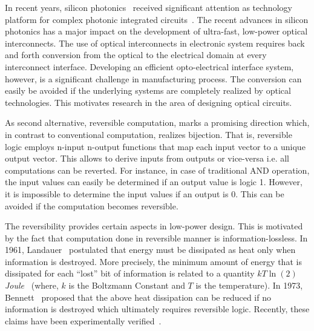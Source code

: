 \documentclass[10pt,letterpaper,twoside,openright]{book}
\begin{document}
In recent years, silicon photonics~\cite{Pavesi:2004} received significant attention as technology platform for complex photonic integrated circuits~\cite{NJSBB2005}. The recent advances in silicon photonics has a major impact on the development of ultra-fast, low-power optical interconnects. 
The use of optical interconnects in electronic system requires back and forth conversion from the optical to the electrical domain at every interconnect interface. Developing an efficient opto-electrical interface system, however, is a significant challenge in manufacturing process. The conversion can easily be avoided if the underlying systems are completely realized by optical technologies. This motivates research in the area of designing optical circuits.   

As second alternative, reversible computation, marks a promising direction which, in contrast to conventional computation, realizes bijection. That is, reversible logic employs n-input n-output functions that map each input vector to a unique output vector. This allows to derive inputs from outputs or vice-versa i.e. all computations can be reverted. For instance, in case of traditional AND operation, the input values can easily be determined if an output value is logic 1. However, it is impossible to determine the input values if an output is 0. This can be avoided if the computation becomes reversible.

The reversibility provides certain aspects in low-power design. This is motivated by the fact that computation done in reversible manner is information-lossless. In 1961, Landauer~\cite{Lan:61} postulated that energy must be dissipated as heat only when information is destroyed. More precisely, the minimum amount of energy that is dissipated for each \enquote{lost} bit of information is related to a quantity $kT\ln(2)$ \emph{Joule}~\cite{Costello:2007} (where, $k$ is the Boltzmann Constant and $T$ is the temperature). In 1973, Bennett~\cite{Ben:73} proposed that the above heat dissipation can be reduced if no information is destroyed which ultimately requires reversible logic. Recently, these claims have been experimentally verified~\cite{berut2012experimental}.
\end{document}
